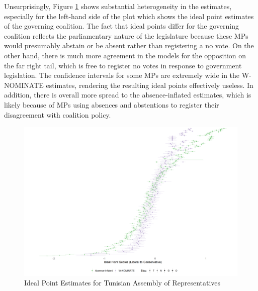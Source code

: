	Unsurprisingly, Figure \ref{tunis_ideal} shows substantial heterogeneity in the estimates, especially for the left-hand side of the plot which shows the ideal point estimates of the governing coalition. The fact that ideal points differ for the governing coalition reflects the parliamentary nature of the legislature because these MPs would presumably abstain or be absent rather than registering a no vote. On the other hand, there is much more agreement in the models for the opposition on the far right tail, which is free to register no votes in response to government legislation. The confidence intervals for some MPs are extremely wide in the W-NOMINATE estimates, rendering the resulting ideal points effectively useless. In addition, there is overall more spread to the absence-inflated estimates, which is likely because of MPs using absences and abstentions to register their disagreement with coalition policy.
	\begin{figure}
		\centering
		\caption{Ideal Point Estimates for Tunisian Assembly of Representatives}\label{tunis_ideal}
		\includegraphics[width=\linewidth]{tunisia_arp_compare}
	\end{figure}

